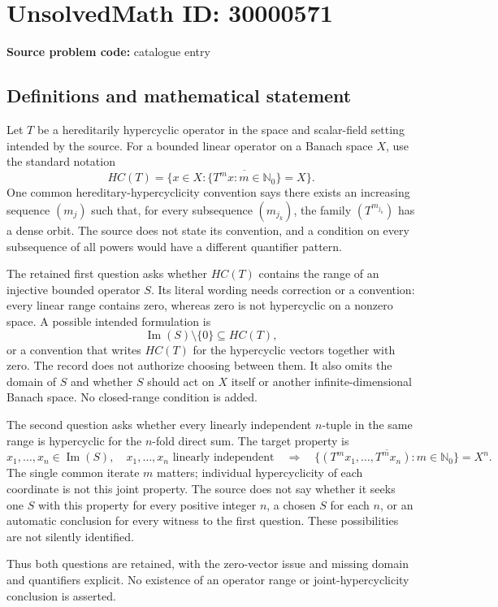 \documentclass[11pt]{article}
\newcommand{\N}{\mathbb{N}}
\begin{document}
\section*{UnsolvedMath ID: 30000571}
\textbf{Source problem code:} catalogue entry
\subsection{Definitions and mathematical statement}
Let $T$ be a hereditarily hypercyclic operator in the space and scalar-field setting intended by the source. For a bounded linear operator on a Banach space $X$, use the standard notation
\[
 HC(T)=\{x\in X:\overline{\{T^mx:m\in\N_0\}}=X\}.
\]
One common hereditary-hypercyclicity convention says there exists an increasing sequence $(m_j)$ such that, for every subsequence $(m_{j_k})$, the family $(T^{m_{j_k}})$ has a dense orbit. The source does not state its convention, and a condition on every subsequence of all powers would have a different quantifier pattern.

The retained first question asks whether $HC(T)$ contains the range of an injective bounded operator $S$. Its literal wording needs correction or a convention: every linear range contains zero, whereas zero is not hypercyclic on a nonzero space. A possible intended formulation is
\[
 \operatorname{Im}(S)\setminus\{0\}\subseteq HC(T),
\]
or a convention that writes $HC(T)$ for the hypercyclic vectors together with zero. The record does not authorize choosing between them. It also omits the domain of $S$ and whether $S$ should act on $X$ itself or another infinite-dimensional Banach space. No closed-range condition is added.

The second question asks whether every linearly independent $n$-tuple in the same range is hypercyclic for the $n$-fold direct sum. The target property is
\[
 x_1,\ldots,x_n\in\operatorname{Im}(S),\quad
 x_1,\ldots,x_n\text{ linearly independent}
 \quad\Longrightarrow\quad
 \overline{\{(T^mx_1,\ldots,T^mx_n):m\in\N_0\}}=X^n.
\]
The single common iterate $m$ matters; individual hypercyclicity of each coordinate is not this joint property. The source does not say whether it seeks one $S$ with this property for every positive integer $n$, a chosen $S$ for each $n$, or an automatic conclusion for every witness to the first question. These possibilities are not silently identified.

Thus both questions are retained, with the zero-vector issue and missing domain and quantifiers explicit. No existence of an operator range or joint-hypercyclicity conclusion is asserted.
\end{document}

